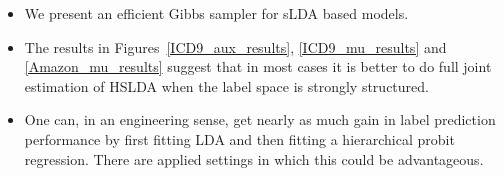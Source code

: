 \documentclass[portrait]{sciposter}
\begin{document}
\begin{multicols}{3}
\begin{itemize}
\item We present an efficient Gibbs sampler for sLDA based models.
\item The results in Figures~\ref{ICD9_aux_results}, \ref{ICD9_mu_results} and \ref{Amazon_mu_results} suggest that in most cases it is better to do full joint estimation of HSLDA when the label space is strongly structured.
\item One can, in an engineering sense, get nearly as much gain in label prediction performance by first fitting LDA and then fitting a hierarchical probit regression.  There are applied settings in which this could be advantageous.
\end{itemize}




\begin{small}  



\end{small}

\end{multicols}
\end{document}
